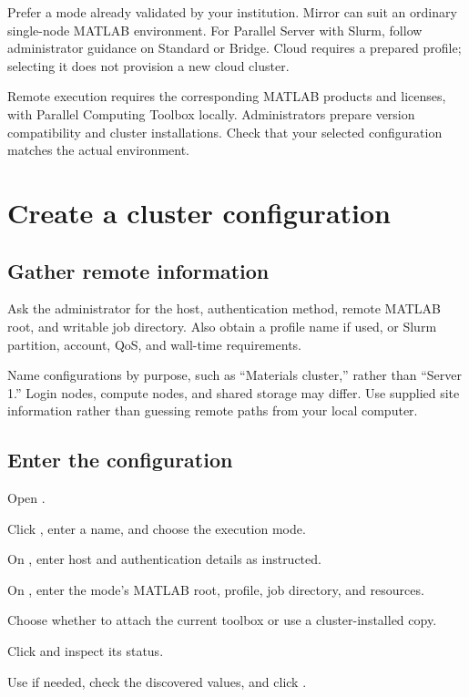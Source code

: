 Prefer a mode already validated by your institution. Mirror can suit an ordinary single-node MATLAB\regmark{} environment. For Parallel Server with Slurm, follow administrator guidance on Standard or Bridge. Cloud requires a prepared profile; selecting it does not provision a new cloud cluster.

Remote execution requires the corresponding MATLAB\regmark{} products and licenses, with Parallel Computing Toolbox locally. Administrators prepare version compatibility and cluster installations. Check that your selected configuration matches the actual environment.

\section{Create a cluster configuration}

\subsection{Gather remote information}

Ask the administrator for the host, authentication method, remote MATLAB\regmark{} root, and writable job directory. Also obtain a profile name if used, or Slurm partition, account, QoS, and wall-time requirements.

Name configurations by purpose, such as ``Materials cluster,'' rather than ``Server 1.'' Login nodes, compute nodes, and shared storage may differ. Use supplied site information rather than guessing remote paths from your local computer.

\subsection{Enter the configuration}

\begin{steps}
\item Open .
\item Click , enter a name, and choose the execution mode.
\item On , enter host and authentication details as instructed.
\item On , enter the mode's MATLAB\regmark{} root, profile, job directory, and resources.
\item Choose whether to attach the current toolbox or use a cluster-installed copy.
\item Click  and inspect its status.
\item Use  if needed, check the discovered values, and click .
\end{steps}

